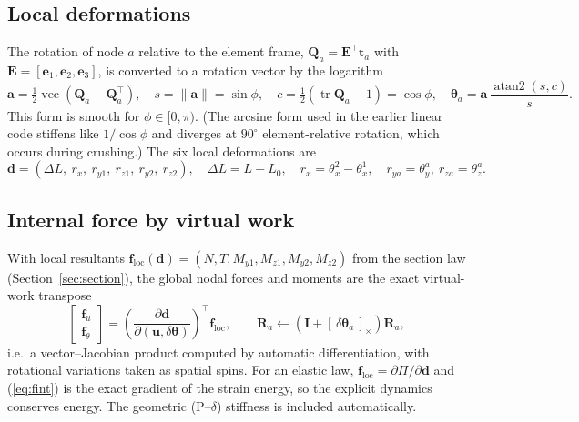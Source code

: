 \documentclass[11pt,a4paper]{article}
\newcommand{\vect}[1]{\bm{#1}}
\newcommand{\mat}[1]{\mathbf{#1}}
\newcommand{\skw}[1]{[\,#1\,]_{\times}}
\begin{document}
\subsection{Local deformations}
The rotation of node $a$ relative to the element frame, $\mat{Q}_a = \mat{E}^\top\mat{t}_a$ with
$\mat{E} = [\vect{e}_1,\vect{e}_2,\vect{e}_3]$, is converted to a rotation vector by the logarithm
\begin{equation}
\vect{a} = \tfrac12\operatorname{vec}\left(\mat{Q}_a-\mat{Q}_a^\top\right),\quad s = \lVert\vect{a}\rVert = \sin\phi,
\quad c = \tfrac12(\operatorname{tr}\mat{Q}_a - 1) = \cos\phi,\quad
\vect{\theta}_a = \vect{a}\,\frac{\operatorname{atan2}(s,c)}{s}.
\label{eq:log}
\end{equation}
This form is smooth for $\phi\in[0,\pi)$. (The arcsine form used in the earlier linear code stiffens like
$1/\cos\phi$ and diverges at $90^\circ$ element-relative rotation, which occurs during crushing.)
The six local deformations are
\begin{equation}
\vect{d} = \left(\Delta L,\ r_x,\ r_{y1},\ r_{z1},\ r_{y2},\ r_{z2}\right),\quad
\Delta L = L - L_0,\quad r_x = \theta^{2}_x-\theta^{1}_x,\quad r_{ya}=\theta^{a}_y,\ r_{za}=\theta^{a}_z .
\end{equation}

\subsection{Internal force by virtual work}
With local resultants $\vect{f}_\mathrm{loc}(\vect{d}) = (N, T, M_{y1}, M_{z1}, M_{y2}, M_{z2})$ from the section
law (Section~\ref{sec:section}), the global nodal forces and moments are the exact virtual-work transpose
\begin{equation}
\begin{bmatrix}\vect{f}_u\\ \vect{f}_\theta\end{bmatrix}
= \left(\frac{\partial\vect{d}}{\partial(\vect{u},\delta\vect{\theta})}\right)^{\!\top}\vect{f}_\mathrm{loc},
\qquad \mat{R}_a \leftarrow \left(\mat{I} + \skw{\delta\vect{\theta}_a}\right)\mat{R}_a ,
\label{eq:fint}
\end{equation}
i.e.\ a vector--Jacobian product computed by automatic differentiation, with rotational variations taken as
spatial spins. For an elastic law, $\vect{f}_\mathrm{loc} = \partial\Pi/\partial\vect{d}$ and
(\ref{eq:fint}) is the exact gradient of the strain energy, so the explicit dynamics conserves energy. The
geometric (P--$\delta$) stiffness is included automatically.
\end{document}
